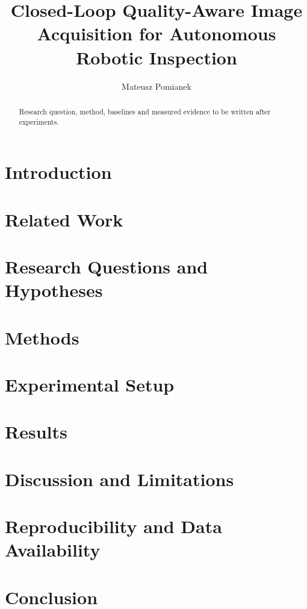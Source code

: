 \documentclass[11pt,a4paper]{article}
\title{Closed-Loop Quality-Aware Image Acquisition for Autonomous Robotic Inspection}
\author{Mateusz Pomianek}
\date{}
\begin{document}
\maketitle
\begin{abstract}
Research question, method, baselines and measured evidence to be written after experiments.
\end{abstract}
\section{Introduction}
\section{Related Work}
\section{Research Questions and Hypotheses}
\section{Methods}
\section{Experimental Setup}
\section{Results}
\section{Discussion and Limitations}
\section{Reproducibility and Data Availability}
\section{Conclusion}
\end{document}
